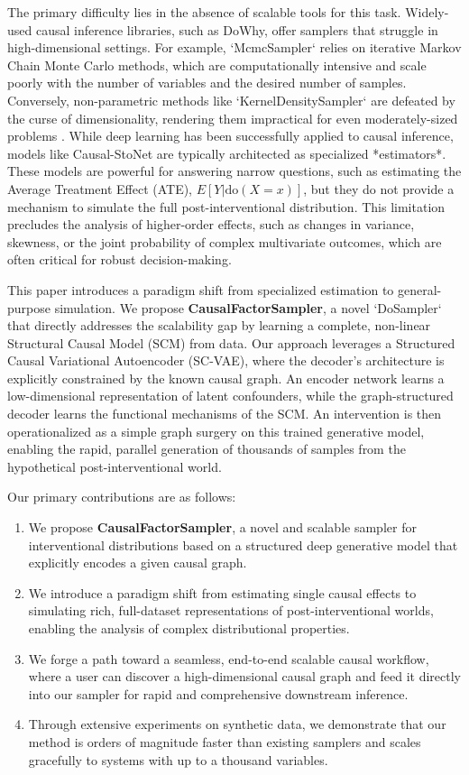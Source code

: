 \documentclass{article} %
\begin{document}
The primary difficulty lies in the absence of scalable tools for this task. Widely-used causal inference libraries, such as DoWhy, offer samplers that struggle in high-dimensional settings. For example, `McmcSampler` relies on iterative Markov Chain Monte Carlo methods, which are computationally intensive and scale poorly with the number of variables and the desired number of samples. Conversely, non-parametric methods like `KernelDensitySampler` are defeated by the curse of dimensionality, rendering them impractical for even moderately-sized problems \cite{bhattacharyya_2020_learning}. While deep learning has been successfully applied to causal inference, models like Causal-StoNet \cite{fang_2024_causal} are typically architected as specialized *estimators*. These models are powerful for answering narrow questions, such as estimating the Average Treatment Effect (ATE), $E[Y|\mathrm{do}(X=x)]$, but they do not provide a mechanism to simulate the full post-interventional distribution. This limitation precludes the analysis of higher-order effects, such as changes in variance, skewness, or the joint probability of complex multivariate outcomes, which are often critical for robust decision-making.

This paper introduces a paradigm shift from specialized estimation to general-purpose simulation. We propose \textbf{CausalFactorSampler}, a novel `DoSampler` that directly addresses the scalability gap by learning a complete, non-linear Structural Causal Model (SCM) from data. Our approach leverages a Structured Causal Variational Autoencoder (SC-VAE), where the decoder's architecture is explicitly constrained by the known causal graph. An encoder network learns a low-dimensional representation of latent confounders, while the graph-structured decoder learns the functional mechanisms of the SCM. An intervention is then operationalized as a simple graph surgery on this trained generative model, enabling the rapid, parallel generation of thousands of samples from the hypothetical post-interventional world.

Our primary contributions are as follows:
\begin{enumerate}
    \item We propose \textbf{CausalFactorSampler}, a novel and scalable sampler for interventional distributions based on a structured deep generative model that explicitly encodes a given causal graph.
    \item We introduce a paradigm shift from estimating single causal effects to simulating rich, full-dataset representations of post-interventional worlds, enabling the analysis of complex distributional properties.
    \item We forge a path toward a seamless, end-to-end scalable causal workflow, where a user can discover a high-dimensional causal graph and feed it directly into our sampler for rapid and comprehensive downstream inference.
    \item Through extensive experiments on synthetic data, we demonstrate that our method is orders of magnitude faster than existing samplers and scales gracefully to systems with up to a thousand variables.
\end{enumerate}
\end{document}
